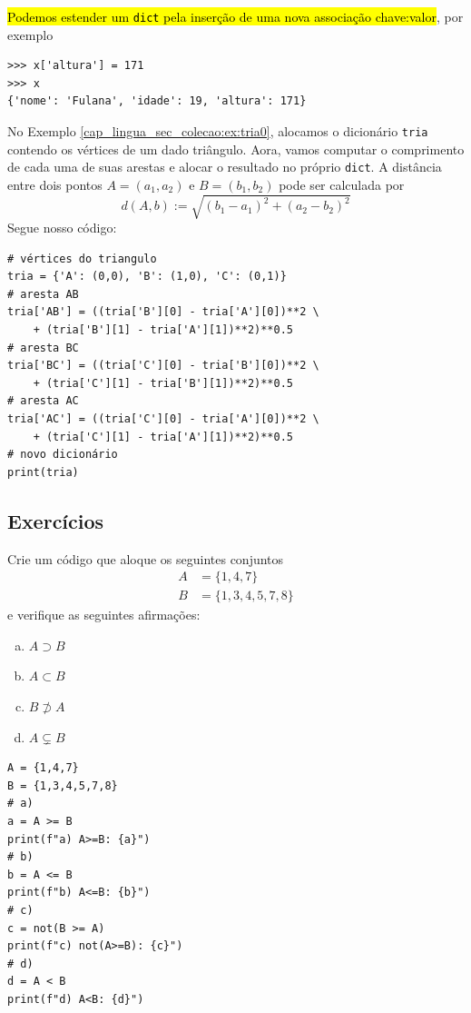 \hl{Podemos estender um \texttt{dict} pela inserção de uma nova associação chave:valor}, por exemplo

\begin{lstlisting}
>>> x['altura'] = 171
>>> x
{'nome': 'Fulana', 'idade': 19, 'altura': 171}
\end{lstlisting}

\begin{ex}
  No Exemplo \ref{cap_lingua_sec_colecao:ex:tria0}, alocamos o dicionário \lstinline+tria+ contendo os vértices de um dado triângulo. Aora, vamos computar o comprimento de cada uma de suas arestas e alocar o resultado no próprio \lstinline+dict+. A distância entre dois pontos $A = (a_1, a_2)$ e $B = (b_1, b_2)$ pode ser calculada por
  \begin{equation}
    d(A, b) := \sqrt{(b_1-a_1)^2 + (a_2-b_2)^2}
  \end{equation}
  Segue nosso código:

\begin{lstlisting}
# vértices do triangulo
tria = {'A': (0,0), 'B': (1,0), 'C': (0,1)}
# aresta AB
tria['AB'] = ((tria['B'][0] - tria['A'][0])**2 \
    + (tria['B'][1] - tria['A'][1])**2)**0.5
# aresta BC
tria['BC'] = ((tria['C'][0] - tria['B'][0])**2 \
    + (tria['C'][1] - tria['B'][1])**2)**0.5
# aresta AC
tria['AC'] = ((tria['C'][0] - tria['A'][0])**2 \
    + (tria['C'][1] - tria['A'][1])**2)**0.5
# novo dicionário
print(tria)
\end{lstlisting}

\end{ex}

\subsection{Exercícios}

\begin{exer}
  Crie um código que aloque os seguintes conjuntos
  \begin{align}
    A &= \{1,4,7\}\\
    B &= \{1,3,4,5,7,8\}
  \end{align}
  e verifique as seguintes afirmações:
  \begin{enumerate}[a)]
  \item $A\supset B$
  \item $A\subset B$
  \item $B\not\supset A$
  \item $A\subsetneq B$
  \end{enumerate}
\end{exer}
\begin{resp}

\begin{lstlisting}
A = {1,4,7}
B = {1,3,4,5,7,8}
# a)
a = A >= B
print(f"a) A>=B: {a}")
# b)
b = A <= B
print(f"b) A<=B: {b}")
# c)
c = not(B >= A)
print(f"c) not(A>=B): {c}")
# d)
d = A < B
print(f"d) A<B: {d}")
\end{lstlisting}

\end{resp}

